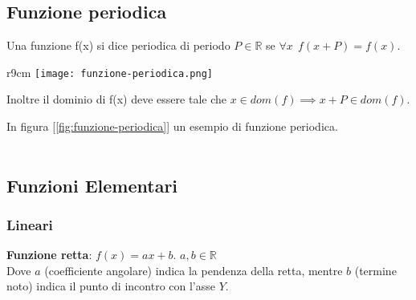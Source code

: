 \subsection{Funzione periodica}
\begin{definition}[Periodicità]
    Una funzione f(x) si dice periodica di periodo $P \in \mathbb{R}$ se $\forall x \: \: f(x + P) = f(x)$. 
\end{definition}
\begin{wrapfigure}{r}{9cm}
    \vspace{-15pt}
    \centering
    \texttt{[image: funzione-periodica.png]}
    \caption{$sin(x) = sin(x + 2\pi)$}
    \label{fig:funzione-periodica}
\end{wrapfigure}
Inoltre il dominio di f(x) deve essere tale che $x \in dom(f) \implies x + P \in dom(f)$.
\begin{example}
In figura [\ref{fig:funzione-periodica}] un esempio di funzione periodica.\\\\
\end{example}

\subsection{Funzioni Elementari}
\subsubsection{Lineari}
\textbf{Funzione retta}: $f(x) = ax + b$. \hspace{.3cm} $a,b \in \mathbb{R}$ \\ Dove $a$ (coefficiente angolare) indica la pendenza della retta, mentre $b$ (termine noto) indica il punto di incontro con l'asse $Y$.

